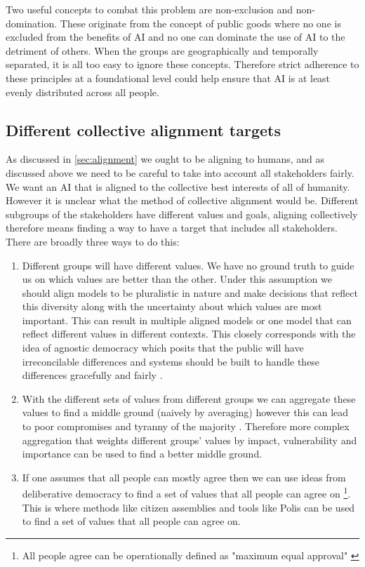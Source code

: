 Two useful concepts to combat this problem are non-exclusion and non-domination. These originate from the concept of public goods \cite{samuelsonPureTheoryPublic1954} where no one is excluded from the benefits of AI and no one can dominate the use of AI to the detriment of others. When the groups are geographically and temporally separated, it is all too easy to ignore these concepts. Therefore strict adherence to these principles at a foundational level could help ensure that AI is at least evenly distributed across all people.

\subsection{Different collective alignment targets}

As discussed in \ref{sec:alignment} we ought to be aligning to humans, and as discussed above we need to be careful to take into account all stakeholders fairly. We want an AI that is aligned to the collective best interests of all of humanity. However it is unclear what the method of collective alignment would be. Different subgroups of the stakeholders have different values and goals, aligning collectively therefore means finding a way to have a target that includes all stakeholders. There are broadly three ways to do this:

\begin{enumerate}
    \item {} Different groups will have different values. We have no ground truth to guide us on which values are better than the other. Under this assumption we should align models to be pluralistic in nature and make decisions that reflect this diversity along with the uncertainty about which values are most important. This can result in multiple aligned models or one model that can reflect different values in different contexts. This closely corresponds with the idea of agnostic democracy which posits that the public will have irreconcilable differences and systems should be built to handle these differences gracefully and fairly \cite{Wenman_2013}.
    \item {} With the different sets of values from different groups we can aggregate these values to find a middle ground (naively by averaging) however this can lead to poor compromises and tyranny of the majority \cite{millLiberty2011,tocquevilleDemocracyAmerica1835}. Therefore more complex aggregation that weights different groups' values by impact, vulnerability and importance can be used to find a better middle ground.
    \item {} If one assumes that all people can mostly agree then we can use ideas from deliberative democracy \cite{habermasFactsNormsContributions1998} to find a set of values that all people can agree on \footnote{All people agree can be operationally defined as "maximum equal approval" \cite{jonathanstrayPracticalDefinitionPolitical}}. This is where methods like citizen assemblies and tools like Polis \cite{compdemocracyPolis2025} can be used to find a set of values that all people can agree on.
\end{enumerate}

